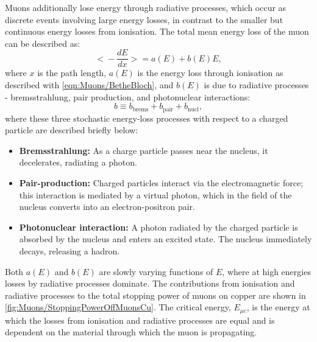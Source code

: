 Muons additionally lose energy through radiative processes, which occur as discrete events involving large energy losses, in contrast to the smaller but continuous energy losses from ionisation. The total mean energy loss of the muon can be described as:
\begin{equation}\label{eqn:Muons/totMeanEnergyLossMu}
    \Biggl<-\frac{dE}{dx}\Biggl>=a(E)+b(E)E,
\end{equation}
where $x$ is the path length, $a(E)$ is the energy loss through ionisation as described with \autoref{eqn:Muons/BetheBloch}, and $b(E)$ is due to radiative
processes - bremsstrahlung, pair production, and photonuclear interactions:
\begin{equation}\label{eqn:Muons/radproc}
    b\equiv b_{\text{brems}}+b_{\text{pair}}+b_{\text{nucl}},
\end{equation}
where these three stochastic energy-loss processes with respect to a charged particle are described briefly below:
\begin{itemize}
    \item \textbf{Bremsstrahlung:} As a charge particle passes near the nucleus, it decelerates, radiating a photon.
    \item \textbf{Pair-production:} Charged particles interact via the electromagnetic force; this interaction is mediated by a virtual photon, which in the field of the nucleus converts into an electron-positron pair.
    \item \textbf{Photonuclear interaction:} A photon radiated by the charged particle is absorbed by the nucleus and enters an excited state. The nucleus immediately decays, releasing a hadron.
\end{itemize}
Both $a(E)$ and $b(E)$ are slowly varying functions of $E$, where at high energies losses by radiative processes dominate. The contributions from ionisation and radiative processes to the total stopping power of muons on copper are shown in \autoref{fig:Muons/StoppingPowerOffMuonsCu}. The critical energy, $E_{\mu c}$, is the energy at which the losses from ionisation and radiative processes are equal and is dependent on the material through which the muon is propagating.
